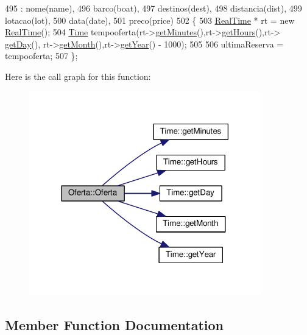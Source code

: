 \begin{DoxyCode}
495                                                                                                            
                          : nome(name),
496 barco(boat),
497 destinos(dest),
498 distancia(dist),
499 lotacao(lot),
500 data(date),
501 preco(price)
502 \{
503     \hyperlink{classRealTime}{RealTime} * rt = \textcolor{keyword}{new} \hyperlink{classRealTime}{RealTime}();
504     \hyperlink{classTime}{Time} tempooferta(rt->\hyperlink{classTime_a800d91da444cd295a329925c45942359}{getMinutes}(),rt->\hyperlink{classTime_ac38ba7bbc9876d7d75c6fb16ba7ac453}{getHours}(),rt->
      \hyperlink{classTime_abdccc37217b520155a67a1d732014f1a}{getDay}(), rt->\hyperlink{classTime_a22fd86b14d3b067cf1447fd9ca5caf6f}{getMonth}(),rt->\hyperlink{classTime_ade4d01d38041bb86a2e1ded9fd3cd28e}{getYear}() - 1000);
505     
506     ultimaReserva = tempooferta;
507 \};
\end{DoxyCode}


Here is the call graph for this function\+:
\nopagebreak
\begin{figure}[H]
\begin{center}
\leavevmode
\includegraphics[width=285pt]{classOferta_a49a53f9d6ba51f97a3b428c8fac98d7f_cgraph}
\end{center}
\end{figure}




\subsection{Member Function Documentation}
